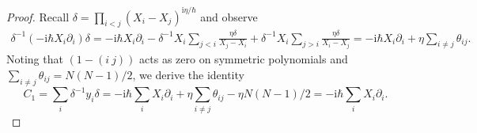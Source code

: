 \documentclass[11pt]{report}
\theoremstyle{definition}
\theoremstyle{remark}
\theoremstyle{remark}
\newcommand{\I}{\mathrm{i}}
\begin{document}
\begin{proof}
Recall $\delta = \prod_{i < j} (X_i-X_j)^{\I \eta / \hbar}$ and observe
\begin{align*}
\delta^{-1} (-\I \hbar X_i \partial_i) \delta = -\I \hbar X_i \partial_i - \delta^{-1} X_i \sum_{j<i} \frac{\eta \delta}{X_j-X_i} + \delta^{-1} X_i \sum_{j>i} \frac{\eta \delta}{X_i-X_j} = -\I \hbar X_i \partial_i + \eta \sum_{i \neq j} \theta_{ij}.
\end{align*}
Noting that $(1-(i \ j))$ acts as zero on symmetric polynomials and $\sum_{i \neq j} \theta_{ij} = N(N-1)/2$, we derive the identity
\begin{equation*}
C_1 = \sum_i \delta^{-1} y_i \delta = -\I \hbar \sum_i X_i \partial_i + \eta \sum_{i \neq j} \theta_{ij} - \eta N(N-1)/2 = -\I \hbar \sum_i X_i \partial_i.
\end{equation*}

\end{proof}
\end{document}
